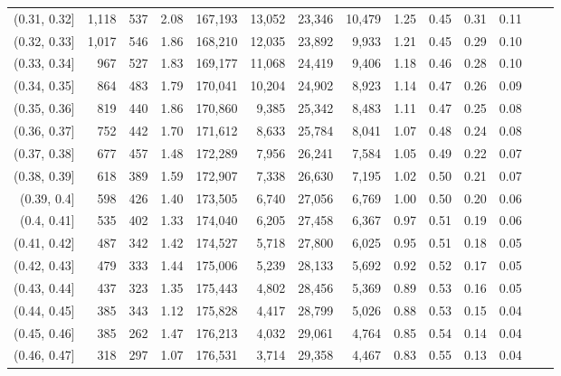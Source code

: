 \begin{tabular}{rrrrrrrrrrrrrr}
(0.31, 0.32]   &   1,118 &    537 &    2.08 &  167,193 &   13,052 &  23,346 &  10,479 &  1.25 &  0.45 &  0.31 &      0.11 \\
(0.32, 0.33]   &   1,017 &    546 &    1.86 &  168,210 &   12,035 &  23,892 &   9,933 &  1.21 &  0.45 &  0.29 &      0.10 \\
(0.33, 0.34]   &     967 &    527 &    1.83 &  169,177 &   11,068 &  24,419 &   9,406 &  1.18 &  0.46 &  0.28 &      0.10 \\
(0.34, 0.35]   &     864 &    483 &    1.79 &  170,041 &   10,204 &  24,902 &   8,923 &  1.14 &  0.47 &  0.26 &      0.09 \\
(0.35, 0.36]   &     819 &    440 &    1.86 &  170,860 &    9,385 &  25,342 &   8,483 &  1.11 &  0.47 &  0.25 &      0.08 \\
(0.36, 0.37]   &     752 &    442 &    1.70 &  171,612 &    8,633 &  25,784 &   8,041 &  1.07 &  0.48 &  0.24 &      0.08 \\
(0.37, 0.38]   &     677 &    457 &    1.48 &  172,289 &    7,956 &  26,241 &   7,584 &  1.05 &  0.49 &  0.22 &      0.07 \\
(0.38, 0.39]   &     618 &    389 &    1.59 &  172,907 &    7,338 &  26,630 &   7,195 &  1.02 &  0.50 &  0.21 &      0.07 \\
(0.39, 0.4]    &     598 &    426 &    1.40 &  173,505 &    6,740 &  27,056 &   6,769 &  1.00 &  0.50 &  0.20 &      0.06 \\
(0.4, 0.41]    &     535 &    402 &    1.33 &  174,040 &    6,205 &  27,458 &   6,367 &  0.97 &  0.51 &  0.19 &      0.06 \\
(0.41, 0.42]   &     487 &    342 &    1.42 &  174,527 &    5,718 &  27,800 &   6,025 &  0.95 &  0.51 &  0.18 &      0.05 \\
(0.42, 0.43]   &     479 &    333 &    1.44 &  175,006 &    5,239 &  28,133 &   5,692 &  0.92 &  0.52 &  0.17 &      0.05 \\
(0.43, 0.44]   &     437 &    323 &    1.35 &  175,443 &    4,802 &  28,456 &   5,369 &  0.89 &  0.53 &  0.16 &      0.05 \\
(0.44, 0.45]   &     385 &    343 &    1.12 &  175,828 &    4,417 &  28,799 &   5,026 &  0.88 &  0.53 &  0.15 &      0.04 \\
(0.45, 0.46]   &     385 &    262 &    1.47 &  176,213 &    4,032 &  29,061 &   4,764 &  0.85 &  0.54 &  0.14 &      0.04 \\
(0.46, 0.47]   &     318 &    297 &    1.07 &  176,531 &    3,714 &  29,358 &   4,467 &  0.83 &  0.55 &  0.13 &      0.04 \\

\end{tabular}
